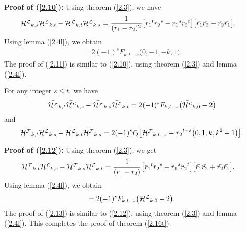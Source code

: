 \noindent\textbf{Proof of (\ref{2.10}):}
Using theorem (\ref{2.3}), we have
\begin{align*}
\bar{{\mathcal{H^L}}}_{k, s}\bar{{\mathcal{H^L}}}_{k,t}-\bar{{\mathcal{H^L}}}_{k,t}\bar{{\mathcal{H^L}}}_{k,s}&=\dfrac{1}{(r_1-r_2)^2}\big[{r_1}^t{r_2}^s-{r_1}^s{r_2}^t\big]\big[\bar{r_1}\bar{r_{2}}-\bar{r_2}\bar{r_1}\big].
\end{align*}
Using lemma (\ref{2.4l}), we obtain
\begin{align*}
=2(-1)^sF_{k, t-s}\big(0, -1, -k, 1\big).
\end{align*}
The proof of (\ref{2.11}) is similar to (\ref{2.10}), using theorem (\ref{2.3}) and lemma (\ref{2.4l}).
\begin{theorem} For any integer $s\leq t$,  we have\label{2.16t}
\begin{align}
\hf_{k, t}\hl_{k,s}-\hf_{k,s}\hl_{k,t}=2(-1)^sF_{k, t-s}\big(\hl_{k,0}-2\big)\label{2.12}
\end{align}
and 
\begin{align}
\hf_{k, t}\hl_{k,s}-\hl_{k,t}\hf_{k,s}=2(-1)^s\bar{r_2}\big[\hf_{k,t-s}-{r_2}^{t-s}\big(0,1,k,k^2+1\big)\big].\label{2.13}
\end{align}
\end{theorem}
\noindent\textbf{Proof of (\ref{2.12}):}
Using theorem (\ref{2.3}), we get
\begin{align*}
\bar{{\mathcal{H^F}}}_{k, t}\bar{{\mathcal{H^L}}}_{k,s}-\bar{{\mathcal{H^F}}}_{k,s}\bar{{\mathcal{H^L}}}_{k,t}&=\dfrac{1}{(r_1-r_2)}\big[{r_1}^t{r_2}^s-{r_1}^s{r_2}^t\big]\big[\bar{r_1}\bar{r_{2}}+\bar{r_2}\bar{r_1}\big].
\end{align*}
Using lemma (\ref{2.4l}), we obtain
\begin{align*}
=2(-1)^sF_{k, t-s}\big(\bar{{\mathcal{H^L}}}_{k,0}-2\big).
\end{align*}
The proof of (\ref{2.13}) is similar to (\ref{2.12}), using theorem (\ref{2.3}) and lemma (\ref{2.4l}).
This completes the proof of theorem (\ref{2.16t}).
